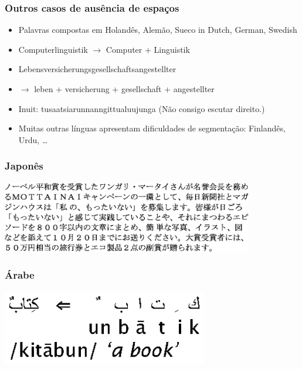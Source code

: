 \documentclass[compress]{beamer}
\begin{document}
\begin{frame}
\frametitle{Outros casos de ausência de espaços}
\begin{itemize}[<+->]
\item Palavras compostas em Holandês, Alemão, Sueco in Dutch, German, Swedish
\item Computerlinguistik $\rightarrow$ Computer + Linguistik
\item Lebensversicherungsgesellschaftsangestellter
\item $\rightarrow$ leben + versicherung + gesellschaft + angestellter
\item Inuit: tusaatsiarunnanngittualuujunga (Não consigo escutar direito.)
\item Muitas outras línguas apresentam dificuldades de segmentação: 
Finlandês, Urdu, \ldots
\end{itemize}
\end{frame}


\begin{frame}
\frametitle{Japonês}

\includegraphics[width=11cm]{Japanese-example-bitmap.eps}




\end{frame}

\begin{frame}
\frametitle{Árabe}
\includegraphics[width=9cm]{Arabic-example.eps}
\end{frame}
\end{document}
